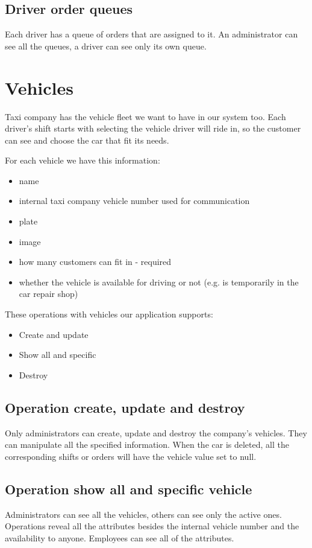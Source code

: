 		\subsection{Driver order queues}
            Each driver has a queue of orders that are assigned to it. An administrator can see all the queues, a driver can see only its own queue.
	
	\section{Vehicles}
		Taxi company has the vehicle fleet we want to have in our system too. Each driver's shift starts with selecting the vehicle driver will ride in, so the customer can see and choose the car that fit its needs.
		
		 For each vehicle we have this information:
		\begin{itemize}
			\item name
			\item internal taxi company vehicle number used for communication
			\item plate
			\item image
			\item how many customers can fit in - required
			\item whether the vehicle is available for driving or not (e.g. is temporarily in the car repair shop)
		\end{itemize}
		These operations with vehicles our application supports:
		\begin{itemize}
			\item Create and update
			\item Show all and specific
			\item Destroy
		\end{itemize}
		\subsection{Operation create, update and destroy}
			Only administrators can create, update and destroy the company's vehicles. They can manipulate all the specified information. When the car is deleted, all the corresponding shifts or orders will have the vehicle value set to null.
		\subsection{Operation show all and specific vehicle}
			Administrators can see all the vehicles, others can see only the active ones. 
			Operations reveal all the attributes besides the internal vehicle number and the availability to anyone. Employees can see all of the attributes.

